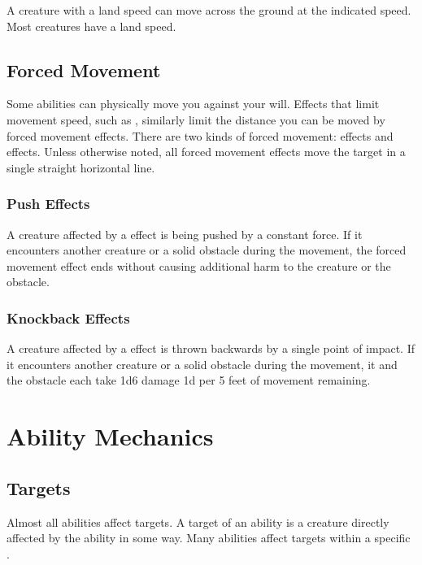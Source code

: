         A creature with a land speed can move across the ground at the indicated speed.
        Most creatures have a land speed.

    \subsection{Forced Movement}\label{Forced Movement}
        Some abilities can physically move you against your will.
        Effects that limit movement speed, such as , similarly limit the distance you can be moved by forced movement effects.
        There are two kinds of forced movement:  effects and  effects.
        Unless otherwise noted, all forced movement effects move the target in a single straight horizontal line.

        \subsubsection{Push Effects}\label{Push Effects}
            A creature affected by a  effect is being pushed by a constant force.
            If it encounters another creature or a solid obstacle during the movement, the forced movement effect ends without causing additional harm to the creature or the obstacle.

        \subsubsection{Knockback Effects}\label{Knockback Effects}
            A creature affected by a  effect is thrown backwards by a single point of impact.
            If it encounters another creature or a solid obstacle during the movement, it and the obstacle each take 1d6 damage \add 1d per 5 feet of movement remaining.

\section{Ability Mechanics}\label{Ability Mechanics}

    \subsection{Targets}\label{Targets}
        Almost all abilities affect targets.
        A target of an ability is a creature directly affected by the ability in some way.
        Many abilities affect targets within a specific .

